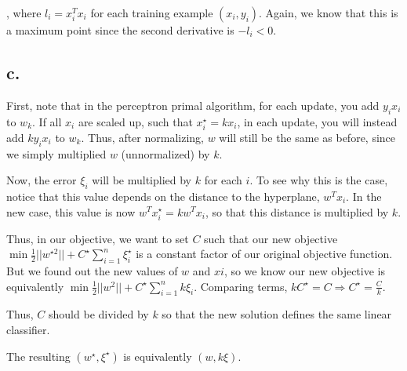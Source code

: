 \documentclass[]{article}
\begin{document}
, where $l_i = x_i^Tx_i$ for each training example $(x_i, y_i)$. Again, we know that this is a maximum point since the second derivative is $-l_i < 0$.

\subsection{c.}
First, note that in the perceptron primal algorithm, for each update, you add $y_i x_i$ to $w_k$. If all $x_i$ are scaled up, such that $x_i^\star = kx_i$, in each update, you will instead add $ky_ix_i$ to $w_k$. Thus, after normalizing, $w$ will still be the same as before, since we simply multiplied $w$ (unnormalized) by $k$.

Now, the error $\xi_i$ will be multiplied by $k$ for each $i$. To see why this is the case, notice that this value depends on the distance to the hyperplane, $w^Tx_i$. In the new case, this value is now $w^Tx_i^\star = kw^Tx_i$, so that this distance is multiplied by $k$.

Thus, in our objective, we want to set $C$ such that our new objective $\min \frac{1}{2}||w^{\star 2}|| + C^\star \sum_{i=1}^n \xi_i^\star$ is a constant factor of our original objective function.
But we found out the new values of $w$ and $xi$, so we know our new objective is equivalently $\min \frac{1}{2}||w^2|| + C^\star \sum_{i=1}^n k\xi_i$. Comparing terms, $kC^\star = C \Rightarrow C^\star = \frac{C}{k}$.

Thus, $C$ should be divided by $k$ so that the new solution defines the same linear classifier.

The resulting $(w^\star, \xi^\star)$ is equivalently $(w, k\xi)$. 
\end{document}
